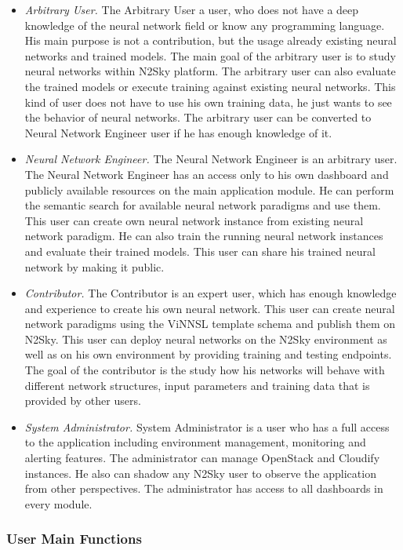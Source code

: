 \begin{itemize}
\item \emph{Arbitrary User.}  The Arbitrary User a user, who does not have a deep knowledge of the neural network field or know any programming language. His main purpose is not a contribution, but the usage already existing neural networks and trained models. The main goal of the arbitrary user is to study neural networks within N2Sky platform. The arbitrary user can also evaluate the trained models or execute training against existing neural networks. This kind of user does not have to use his own training data, he just wants to see the behavior of neural networks. The arbitrary user can be converted to Neural Network Engineer user if he has enough knowledge of it. 
\item \emph{Neural Network Engineer.} The Neural Network Engineer is an arbitrary user. The Neural Network Engineer has an access only to his own dashboard and publicly available resources on the main application module. He can perform the semantic search for available neural network paradigms and use them. This user can create own neural network instance from existing neural network paradigm. He can also train the running neural network instances and evaluate their trained models. This user can share his trained neural network by making it public. 
\item \emph{Contributor.} The Contributor is an expert user, which has enough knowledge and experience to create his own neural network. This user can create neural network paradigms using the ViNNSL template schema and publish them on N2Sky. This user can deploy neural networks on the N2Sky environment as well as on his own environment by providing training and testing endpoints. The goal of the contributor is the study how his networks will behave with different network structures, input parameters and training data that is provided by other users.
\item \emph{System Administrator.} System Administrator is a user who has a full access to the application including environment management, monitoring and alerting features. The administrator can manage OpenStack and Cloudify instances. He also can shadow any N2Sky user to observe the application from other perspectives. The administrator has access to all dashboards in every module.
\end{itemize}


\subsubsection{User Main Functions}\label{User Permissions}

